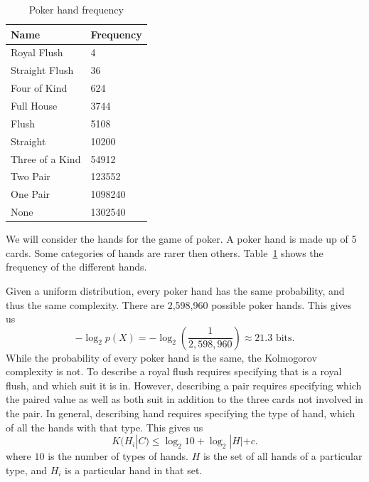 \begin{table}
    \begin{tabular}{ll}
        Name & Frequency \\
        \hline
        Royal Flush & 4 \\
        Straight Flush & 36 \\
        Four of Kind & 624 \\
          Full House & 3744 \\
               Flush & 5108 \\
            Straight & 10200 \\
     Three of a Kind & 54912 \\
            Two Pair & 123552 \\
            One Pair & 1098240 \\
            None & 1302540 \\
    \end{tabular}
    \caption{Poker hand frequency}
    \label{poker}
\end{table}
We will consider the hands for the game of poker.
A poker hand is made up of 5 cards.
Some categories of hands are rarer then others.
Table~\ref{poker} shows the frequency of the different hands.

Given a uniform distribution, every poker hand has the same probability, and thus the same complexity.
There are 2,598,960 possible poker hands. 
This gives us
\begin{equation}
    -\log_2{p(X)} = -\log_2(\frac{1}{2,598,960}) \approx 21.3 \mbox{ bits.}
\end{equation}
While the probability of every poker hand is the same, the Kolmogorov complexity is not.
To describe a royal flush requires specifying that is a royal flush, and which suit it is in.
However, describing a pair requires specifying which the paired value as well as both suit in addition to the three cards not involved in the pair.
In general, describing hand requires specifying the type of hand, which of all the hands with that type.
This gives us
\begin{equation}
    \label{kc.card}
    K(H_i|C) \leq \log_2 10 + \log_2 |H| + c \mbox{.}
\end{equation} where $10$ is the number of types of hands. $H$ is the set of all hands of a particular type, and $H_i$ is a particular hand in that set.

